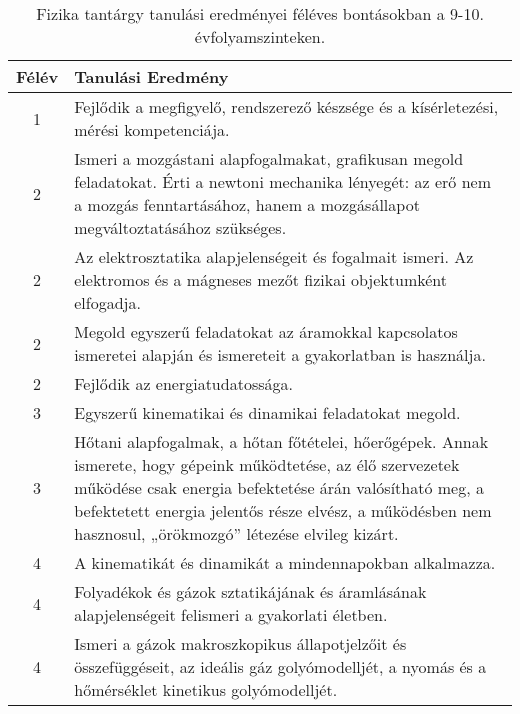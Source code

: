            \begin{longtable}{c | p{} }
            \caption[Fizika 9-10.]{Fizika tantárgy tanulási eredményei féléves bontásokban a 9-10. évfolyamszinteken. }  \\

            \textbf{Félév} & \textbf{Tanulási Eredmény} \\
            \hline
            \endhead
                                
                                          1 &  Fejlődik a megfigyelő, rendszerező készsége és a kísérletezési, mérési kompetenciája. \\ \hline
                                      
                                
                                          2 &  Ismeri a mozgástani alapfogalmakat, grafikusan megold feladatokat. Érti a newtoni mechanika lényegét: az erő nem a mozgás fenntartásához, hanem a mozgásállapot megváltoztatásához szükséges. \\ \hline
                                          2 &  Az elektrosztatika alapjelenségeit és fogalmait ismeri. Az elektromos és a mágneses mezőt fizikai objektumként elfogadja. \\ \hline
                                          2 &  Megold egyszerű feladatokat az áramokkal kapcsolatos ismeretei alapján és ismereteit a gyakorlatban is használja. \\ \hline
                                          2 &  Fejlődik az energiatudatossága. \\ \hline
                                      
                                
                                          3 &  Egyszerű kinematikai és dinamikai feladatokat megold. \\ \hline
                                          3 &  Hőtani alapfogalmak, a hőtan főtételei, hőerőgépek. Annak ismerete, hogy gépeink működtetése, az élő szervezetek működése csak energia befektetése árán valósítható meg, a befektetett energia jelentős része elvész, a működésben nem hasznosul, „örökmozgó” létezése elvileg kizárt. \\ \hline
                                      
                                
                                          4 &  A kinematikát és dinamikát a mindennapokban alkalmazza. \\ \hline
                                          4 &  Folyadékok és gázok sztatikájának és áramlásának alapjelenségeit felismeri a gyakorlati életben. \\ \hline
                                          4 &  Ismeri a gázok makroszkopikus állapotjelzőit és összefüggéseit, az ideális gáz golyómodelljét, a nyomás és a hőmérséklet kinetikus golyómodelljét. \\ \hline
                                      
                        \end{longtable}
            \clearpage

